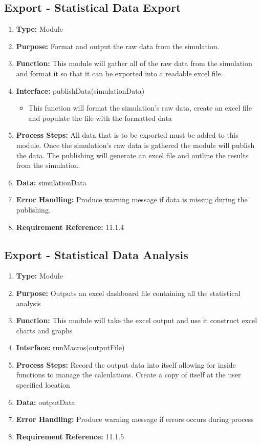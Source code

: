 \documentclass[paper=letter, fontsize=10pt]{scrartcl}
\numberwithin{equation}{section}		%
\numberwithin{figure}{section}			%
\numberwithin{table}{section}				%
\begin{document}
\subsection{Export - Statistical Data Export}
\begin{enumerate}[]
	\item \textbf{Type:} Module
	\item \textbf{Purpose:} Format and output the raw data from the simulation.
	\item \textbf{Function:} This module will gather all of the raw data from the simulation and format it  so that it can be exported into a readable excel file.
	\item \textbf{Interface:}
	publishData(simulationData)
	\begin{itemize}
		\item This function will format the simulation's raw data, create an excel file and populate the file with the formatted data
	\end{itemize}
	\item \textbf{Process Steps:} All data that is to be exported must be added to this module.  Once the simulation's raw data is gathered the module will publish the data.  The publishing will generate an excel file and outline the results from the simulation.
	\item \textbf{Data:} simulationData
	\item \textbf{Error Handling:}  Produce warning message if data is missing during the publishing.
	\item \textbf{Requirement Reference:} 11.1.4
\end{enumerate}

\subsection{Export - Statistical Data Analysis}
\begin{enumerate}[]
	\item \textbf{Type:} Module
	\item \textbf{Purpose:} Outputs an excel dashboard file containing all the statistical analysis
	\item \textbf{Function:} This module will take the excel output and use it construct excel charts and graphs  
	\item \textbf{Interface:}
	runMacros(outputFile)
	\item \textbf{Process Steps:} Record the output data into itself allowing for inside functions to manage the calculations. Create a copy of itself at the user specified location
	\item \textbf{Data:} outputData
	\item \textbf{Error Handling:} Produce warning message if errors occurs during process
	\item \textbf{Requirement Reference:} 11.1.5
\end{enumerate}
\end{document}
